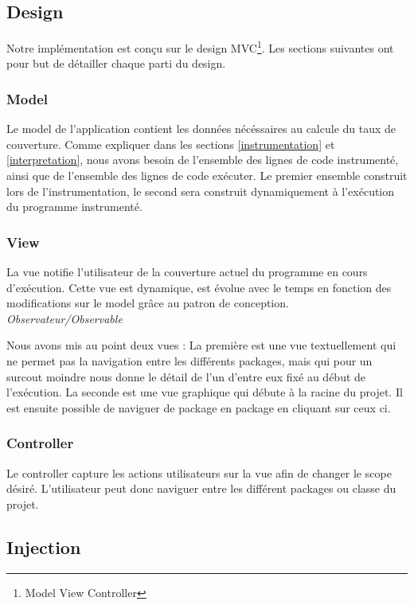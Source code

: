 \subsection{Design}

Notre implémentation est conçu sur le design MVC\footnote{Model View Controller}. Les sections suivantes ont pour but de détailler chaque parti du design.

\subsubsection{Model}

Le model de l'application contient les données nécéssaires au calcule du taux de couverture. Comme expliquer dans les sections \ref{instrumentation} et \ref{interpretation}, nous avons besoin de l'ensemble des lignes de code instrumenté, ainsi que de l'ensemble des lignes de code exécuter. Le premier ensemble construit lors de l'instrumentation, le second sera construit dynamiquement à l'exécution du programme instrumenté.

\subsubsection{View}

La vue notifie l'utilisateur de la couverture actuel du programme en cours d'exécution. Cette vue est dynamique, est évolue avec le temps en fonction des modifications sur le model grâce au patron de conception. \textit{Observateur/Observable}
\\
\par Nous avons mis au point deux vues :
La première est une vue textuellement qui ne permet pas la navigation entre les différents packages, mais qui pour un surcout moindre nous donne le détail de l'un d'entre eux fixé au début de l'exécution.
La seconde est une vue graphique qui débute à la racine du projet. Il est ensuite possible de naviguer de package en package en cliquant sur ceux ci.

\subsubsection{Controller}

Le controller capture les actions utilisateurs sur la vue afin de changer le scope désiré. L'utilisateur peut donc naviguer entre les différent packages ou classe du projet.

\subsection{Injection}


